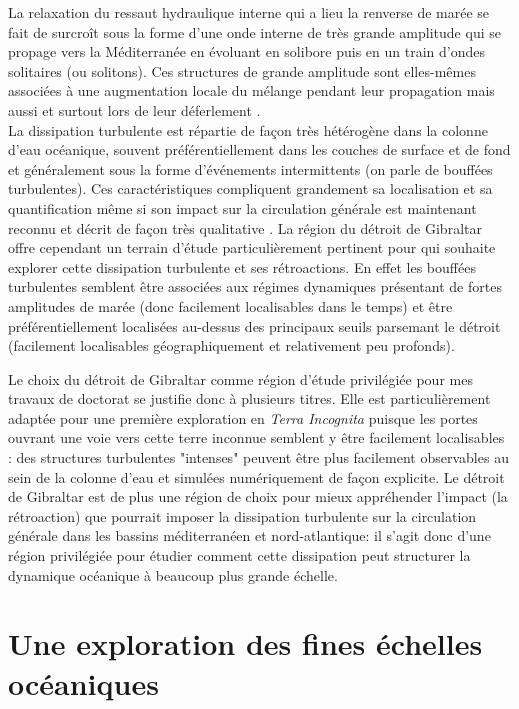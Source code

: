 La relaxation du ressaut hydraulique interne qui a lieu la renverse de marée se fait de surcroît sous la forme d'une onde interne de très grande amplitude qui se propage vers la Méditerranée en évoluant en solibore puis en un train d'ondes solitaires (ou solitons). Ces structures de grande amplitude sont elles-mêmes associées à une augmentation locale du mélange pendant leur propagation mais aussi et surtout lors de leur déferlement \citep{vlasenko_2009}. \\

La dissipation turbulente est répartie de façon très hétérogène dans la colonne d'eau océanique, souvent préférentiellement dans les couches de surface et de fond et généralement sous la forme d'événements intermittents (on parle de bouffées turbulentes). Ces caractéristiques compliquent grandement sa localisation et sa quantification même si son impact sur la circulation générale est maintenant reconnu et décrit de façon très qualitative \citep{de_lavergne_abyssal_2017}. 
La région du détroit de Gibraltar offre cependant un terrain d'étude particulièrement pertinent pour qui souhaite explorer cette dissipation turbulente et ses rétroactions. En effet les bouffées turbulentes semblent être associées aux régimes dynamiques présentant de fortes amplitudes de marée (donc facilement localisables dans le temps) et être préférentiellement localisées au-dessus des principaux seuils parsemant le détroit (facilement localisables géographiquement et relativement peu profonds).

Le choix du détroit de Gibraltar comme région d'étude privilégiée pour mes travaux de doctorat se justifie donc à plusieurs titres. Elle est particulièrement adaptée pour une première exploration en \textit{Terra Incognita} puisque les portes ouvrant une voie vers cette terre inconnue semblent y être facilement localisables : des structures turbulentes "intenses" peuvent être plus facilement observables au sein de la colonne d'eau et simulées numériquement de façon explicite. Le détroit de Gibraltar est de plus une région de choix pour mieux appréhender l'impact (la rétroaction) que pourrait imposer la dissipation turbulente sur la circulation générale dans les bassins méditerranéen et nord-atlantique: il s'agit donc d'une région privilégiée pour étudier comment cette dissipation peut structurer la dynamique océanique à beaucoup plus grande échelle.


\section{Une exploration des fines échelles océaniques}
